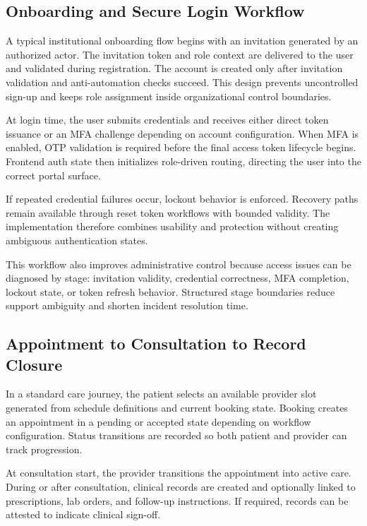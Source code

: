 \subsection{Onboarding and Secure Login Workflow}\label{5161-onboarding-and-secure-login-workflow}

A typical institutional onboarding flow begins with an invitation generated by an authorized actor. The invitation token and role context are delivered to the user and validated during registration. The account is created only after invitation validation and anti-automation checks succeed. This design prevents uncontrolled sign-up and keeps role assignment inside organizational control boundaries.

At login time, the user submits credentials and receives either direct token issuance or an MFA challenge depending on account configuration. When MFA is enabled, OTP validation is required before the final access token lifecycle begins. Frontend auth state then initializes role-driven routing, directing the user into the correct portal surface.

If repeated credential failures occur, lockout behavior is enforced. Recovery paths remain available through reset token workflows with bounded validity. The implementation therefore combines usability and protection without creating ambiguous authentication states.

This workflow also improves administrative control because access issues can be diagnosed by stage: invitation validity, credential correctness, MFA completion, lockout state, or token refresh behavior. Structured stage boundaries reduce support ambiguity and shorten incident resolution time.

\subsection{Appointment to Consultation to Record Closure}\label{5162-appointment-to-consultation-to-record-closure}

In a standard care journey, the patient selects an available provider slot generated from schedule definitions and current booking state. Booking creates an appointment in a pending or accepted state depending on workflow configuration. Status transitions are recorded so both patient and provider can track progression.

At consultation start, the provider transitions the appointment into active care. During or after consultation, clinical records are created and optionally linked to prescriptions, lab orders, and follow-up instructions. If required, records can be attested to indicate clinical sign-off.

